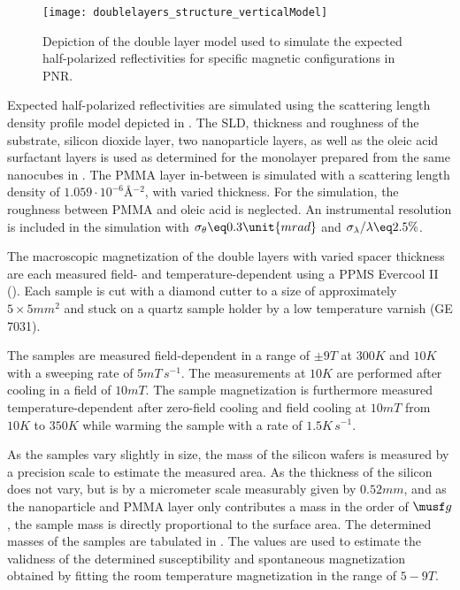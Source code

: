 \documentclass[\main/dresen_thesis.tex]{subfiles}
\begin{document}
    \begin{figure}[tb]
      \centering
      \texttt{[image: doublelayers\_structure\_verticalModel]}
      \caption{\label{fig:doubleLayers:characterization:doublelayerModel}Depiction of the double layer model used to simulate the expected half-polarized reflectivities for specific magnetic configurations in PNR.}
    \end{figure}
    Expected half-polarized reflectivities are simulated using the scattering length density profile model depicted in .
    The SLD, thickness and roughness of the substrate, silicon dioxide layer, two nanoparticle layers, as well as the oleic acid surfactant layers is used as determined for the monolayer prepared from the same nanocubes in .
    The PMMA layer in-between is simulated with a scattering length density of $1.059 \cdot \unit{10^{-6} \angstrom^{-2}}$, with varied thickness.
    For the simulation, the roughness between PMMA and oleic acid is neglected.
    An instrumental resolution is included in the simulation with $\sigma_\theta \eq 0.3 \unit{mrad}$ and $\sigma_\lambda / \lambda \eq 2.5 \%$.
    
    The macroscopic magnetization of the double layers with varied spacer thickness are each measured field- and temperature-dependent using a PPMS Evercool II ().
    Each sample is cut with a diamond cutter to a size of approximately $5 \times 5 \unit{mm^2}$ and stuck on a quartz sample holder by a low temperature varnish (GE 7031).

    The samples are measured field-dependent in a range of $\pm 9 \unit{T}$ at $300 \unit{K}$ and $10 \unit{K}$ with a sweeping rate of $5 \unit{mT \, s^{-1}}$.
    The measurements at $10 \unit{K}$ are performed after cooling in a field of $10 \unit{mT}$.
    The sample magnetization is furthermore measured temperature-dependent after zero-field cooling and field cooling at $10 \unit{mT}$ from $10 \unit{K}$ to $350 \unit{K}$ while warming the sample with a rate of $1.5 \unit{K \, s^{-1}}$.

    As the samples vary slightly in size, the mass of the silicon wafers is measured by a precision scale to estimate the measured area. As the thickness of the silicon does not vary, but is by a micrometer scale measurably given by $0.52 \unit{mm}$, and as the nanoparticle and PMMA layer only contributes a mass in the order of $\musf g$, the sample mass is directly proportional to the surface area.
    The determined masses of the samples are tabulated in .
    The values are used to estimate the validness of the determined susceptibility and spontaneous magnetization obtained by fitting the room temperature magnetization in the range of $5 - 9 \unit{T}$.
\end{document}

